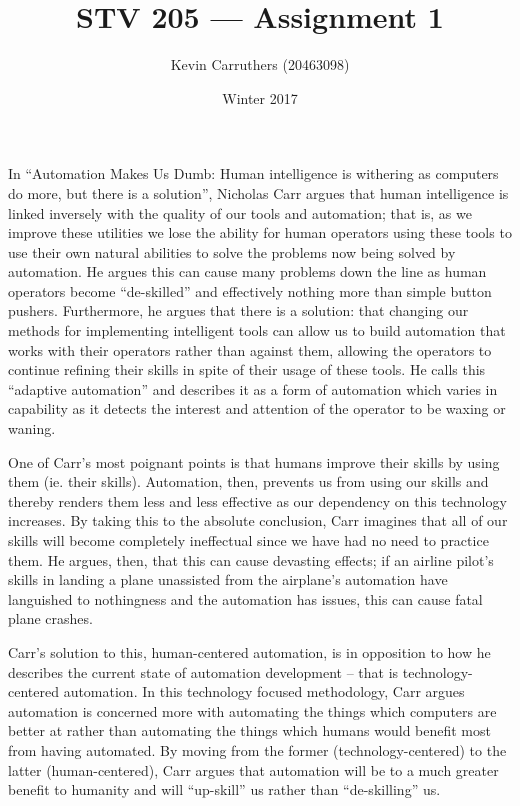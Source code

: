 \documentclass[12pt]{article}
\begin{document}
\title{STV 205 --- Assignment 1}
\author{Kevin Carruthers (20463098)}
\date{\vspace{-2ex}Winter 2017}
\maketitle\HRule

\section*{}
In ``Automation Makes Us Dumb: Human intelligence is withering as computers do more, but there is a solution'', Nicholas Carr argues that human intelligence is linked inversely with the quality of our tools and automation; that is, as we improve these utilities we lose the ability for human operators using these tools to use their own natural abilities to solve the problems now being solved by automation. He argues this can cause many problems down the line as human operators become ``de-skilled'' and effectively nothing more than simple button pushers. Furthermore, he argues that there is a solution: that changing our methods for implementing intelligent tools can allow us to build automation that works with their operators rather than against them, allowing the operators to continue refining their skills in spite of their usage of these tools. He calls this ``adaptive automation'' and describes it as a form of automation which varies in capability as it detects the interest and attention of the operator to be waxing or waning.

One of Carr's most poignant points is that humans improve their skills by using them (ie. their skills). Automation, then, prevents us from using our skills and thereby renders them less and less effective as our dependency on this technology increases. By taking this to the absolute conclusion, Carr imagines that all of our skills will become completely ineffectual since we have had no need to practice them. He argues, then, that this can cause devasting effects; if an airline pilot's skills in landing a plane unassisted from the airplane's automation have languished to nothingness and the automation has issues, this can cause fatal plane crashes.

Carr's solution to this, human-centered automation, is in opposition to how he describes the current state of automation development -- that is technology-centered automation. In this technology focused methodology, Carr argues automation is concerned more with automating the things which computers are better at rather than automating the things which humans would benefit most from having automated. By moving from the former (technology-centered) to the latter (human-centered), Carr argues that automation will be to a much greater benefit to humanity and will ``up-skill'' us rather than ``de-skilling'' us.
\end{document}
